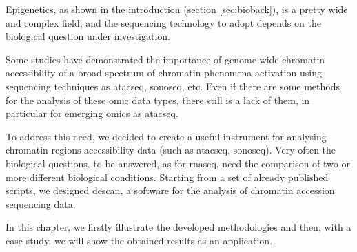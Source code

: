 
Epigenetics, as shown in the introduction (section \ref{sec:bioback}), is a pretty wide and complex field, and the sequencing technology to adopt depends on the biological question under investigation.

Some studies \cite{Koberstein2018, Auerbach2009} have demonstrated the importance of genome-wide chromatin accessibility of a broad spectrum of chromatin phenomena activation using sequencing techniques as \gls{atacseq}, \gls{sonoseq}, etc.
Even if there are some methods for the analysis of these omic data types, there still is a lack of them, in particular for emerging omics as \gls{atacseq}.

To address this need, we decided to create a useful instrument for analysing chromatin regions accessibility data (such as \gls{atacseq}, \gls{sonoseq}).
Very often the biological questions, to be answered, as for \gls{rnaseq}, need the comparison of two or more different biological conditions.
Starting from a set of already published \cite{Koberstein2018} scripts, we designed \gls{descan}, a software for the analysis of chromatin accession sequencing data.

In this chapter, we firstly illustrate the developed methodologies and then, with a case study, we will show the obtained results as an application.